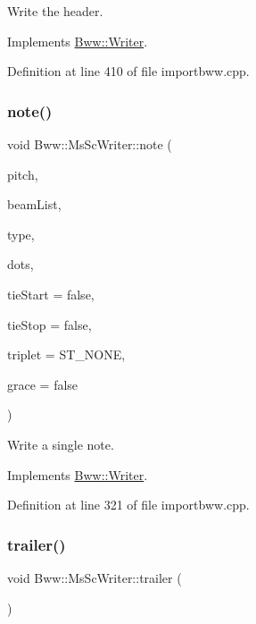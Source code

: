 Write the header. 

Implements \hyperlink{class_bww_1_1_writer}{Bww\+::\+Writer}.



Definition at line 410 of file importbww.\+cpp.

\mbox{\label{class_bww_1_1_ms_sc_writer_a14b90e89cf41fd7590a5ec89411a699f}} 
\subsubsection{\texorpdfstring{note()}{note()}}
{\footnotesize\ttfamily void Bww\+::\+Ms\+Sc\+Writer\+::note (\begin{DoxyParamCaption}\item[{const Q\+String}]{pitch,  }\item[{const Q\+Vector$<$ Bww\+::\+Beam\+Type $>$}]{beam\+List,  }\item[{const Q\+String}]{type,  }\item[{const int}]{dots,  }\item[{bool}]{tie\+Start = {\ttfamily false},  }\item[{bool}]{tie\+Stop = {\ttfamily false},  }\item[{Start\+Stop}]{triplet = {\ttfamily ST\+\_\+NONE},  }\item[{bool}]{grace = {\ttfamily false} }\end{DoxyParamCaption})\hspace{0.3cm}{\ttfamily [virtual]}}

Write a single note. 

Implements \hyperlink{class_bww_1_1_writer}{Bww\+::\+Writer}.



Definition at line 321 of file importbww.\+cpp.

\mbox{\label{class_bww_1_1_ms_sc_writer_a8dcafaba05ea6dd04f11878e58f53bba}} 
\subsubsection{\texorpdfstring{trailer()}{trailer()}}
{\footnotesize\ttfamily void Bww\+::\+Ms\+Sc\+Writer\+::trailer (\begin{DoxyParamCaption}{ }\end{DoxyParamCaption})\hspace{0.3cm}{\ttfamily [virtual]}}

